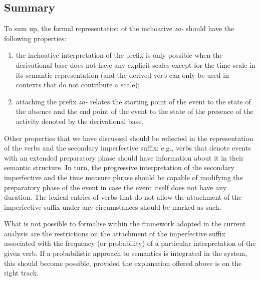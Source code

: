 \subsection{Summary}
To sum up, the formal representation of the inchoative  \textit{za-}   should have the following properties: 
\begin{enumerate}
\item the inchoative  interpretation of the prefix is only possible when the derivational base does not have any explicit scales except for the time scale in its semantic representation (and the derived verb can only be used in contexts   that do not contribute a scale);
\item attaching the prefix \textit{za-}   relates the starting point of the event to the state of the absence and the end point of the event to the state of the presence of the activity denoted by the derivational base.
\end{enumerate}

Other properties that we have discussed should be reflected in the representation of the verbs and the secondary imperfective  suffix: e.g., verbs that denote events with an extended preparatory phase should have information about it in their semantic structure. In turn, the progressive interpretation  of the secondary imperfective  and the time measure phrase  should be capable of modifying the preparatory phase of the event in case the event itself does not have any duration. The lexical entries of verbs that do not allow the attachment of the imperfective suffix   under any circumstances should be marked as such.

What is not possible to formalise within the framework adopted in the current analysis are the restrictions on the attachment of the imperfective suffix   associated with the frequency (or probability) of a particular interpretation of the given verb. If a probabilistic approach to semantics is integrated in the system, this should become possible, provided the explanation offered above is on the right track.

